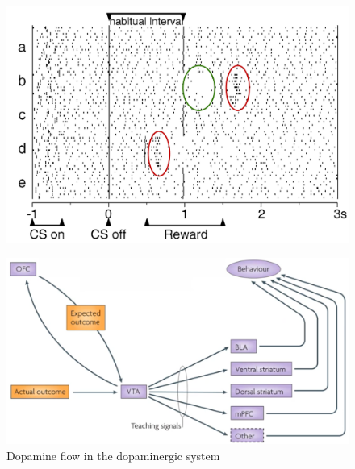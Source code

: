 \begin{description}
\begin{description}
\begin{casestudy}
                    \begin{figure}[H]
                        \centering
                        \includegraphics[width=0.45\linewidth]{../module1/img/dopamine_timing.png}
                    \end{figure}
                \end{casestudy}
    \end{description}
\end{description}

\begin{figure}[H]
    \centering
    \includegraphics[width=0.7\linewidth]{./img/dopamine_flow.png}
    \caption{Dopamine flow in the dopaminergic system}
\end{figure}

